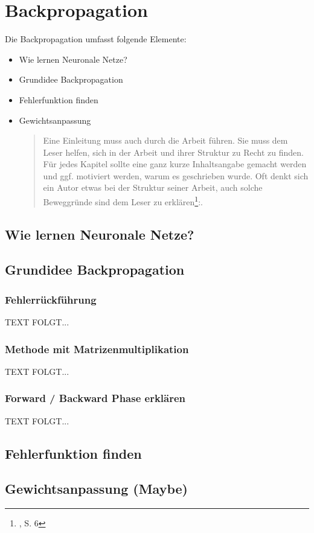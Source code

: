 \newpage
\thispagestyle{empty}
\section{Backpropagation}\label{sec:backpropagation}   

\vspace{1cm}
\begin{tcolorbox}[title={Inhalt}]
Die Backpropagation umfasst folgende Elemente:
\begin{itemize}
\item Wie lernen Neuronale Netze?
\item Grundidee Backpropagation
\item Fehlerfunktion finden
\item Gewichtsanpassung
\begin{quotation}
Eine Einleitung muss auch durch die Arbeit führen. Sie muss dem Leser helfen, sich in der Arbeit und ihrer Struktur zu Recht zu finden. Für jedes Kapitel sollte eine ganz kurze Inhaltsangabe gemacht werden und ggf. motiviert werden, warum es geschrieben wurde. Oft denkt sich ein Autor etwas bei der Struktur seiner Arbeit, auch solche Beweggründe sind dem Leser zu erklären\footnote{\cite{BBoJ}, S. 6}:. 
\end{quotation}
\end{itemize}
\end{tcolorbox}

\subsection{Wie lernen Neuronale Netze?}\label{subsec:backpropagation:lernen_nn}

\subsection{Grundidee Backpropagation}\label{subsec:backpropagation:grundiee}
\subsubsection{Fehlerrückführung}\label{subsec:backpropagation:fehlerrueckfuehrung}
  TEXT FOLGT...

\subsubsection{Methode mit Matrizenmultiplikation}\label{subsec:backpropagation:matrizen}
  TEXT FOLGT...

\subsubsection{Forward / Backward Phase erklären}\label{subsec:backpropagation:forward_backward}
  TEXT FOLGT...

\subsection{Fehlerfunktion finden}\label{subsec:backpropagation:fehlerfunktion}

\subsection{Gewichtsanpassung (Maybe)}\label{subsec:backpropagation:gewichtsanpassung}
